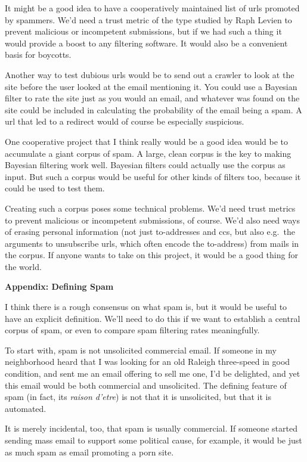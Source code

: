 \documentclass[12pt]{book}
\begin{document}
It might be a good idea to have a cooperatively maintained list of urls
promoted by spammers. We'd need a trust metric of the type studied by
Raph Levien to prevent malicious or incompetent submissions, but if we
had such a thing it would provide a boost to any filtering software. It
would also be a convenient basis for boycotts.

Another way to test dubious urls would be to send out a crawler to look
at the site before the user looked at the email mentioning it. You could
use a Bayesian filter to rate the site just as you would an email, and
whatever was found on the site could be included in calculating the
probability of the email being a spam. A url that led to a redirect
would of course be especially suspicious.

One cooperative project that I think really would be a good idea would
be to accumulate a giant corpus of spam. A large, clean corpus is the
key to making Bayesian filtering work well. Bayesian filters could
actually use the corpus as input. But such a corpus would be useful for
other kinds of filters too, because it could be used to test them.

Creating such a corpus poses some technical problems. We'd need trust
metrics to prevent malicious or incompetent submissions, of course. We'd
also need ways of erasing personal information (not just to-addresses
and ccs, but also e.g.~the arguments to unsubscribe urls, which often
encode the to-address) from mails in the corpus. If anyone wants to take
on this project, it would be a good thing for the world.

\textbf{Appendix: Defining Spam}

I think there is a rough consensus on what spam is, but it would be
useful to have an explicit definition. We'll need to do this if we want
to establish a central corpus of spam, or even to compare spam filtering
rates meaningfully.

To start with, spam is not unsolicited commercial email. If someone in
my neighborhood heard that I was looking for an old Raleigh three-speed
in good condition, and sent me an email offering to sell me one, I'd be
delighted, and yet this email would be both commercial and unsolicited.
The defining feature of spam (in fact, its \emph{raison d'etre}) is not
that it is unsolicited, but that it is automated.

It is merely incidental, too, that spam is usually commercial. If
someone started sending mass email to support some political cause, for
example, it would be just as much spam as email promoting a porn site.
\end{document}
